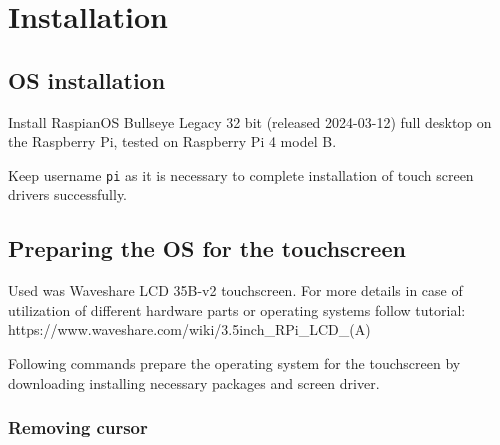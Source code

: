 \section{Installation}\label{installation}

\subsection{OS installation}\label{os-installation}

Install RaspianOS Bullseye Legacy 32 bit (released 2024-03-12) full
desktop on the Raspberry Pi, tested on Raspberry Pi 4 model B.

Keep username \texttt{pi} as it is necessary to complete installation of
touch screen drivers successfully.

\subsection{Preparing the OS for the
touchscreen}\label{preparing-the-os-for-the-touchscreen}

Used was Waveshare LCD 35B-v2 touchscreen. For more details in case of
utilization of different hardware parts or operating systems follow
tutorial: https://www.waveshare.com/wiki/3.5inch\_RPi\_LCD\_(A)

Following commands prepare the operating system for the touchscreen by
downloading installing necessary packages and screen driver.

\begin{Shaded}
\begin{Highlighting}[]
 
\NormalTok{ \textasciitilde{}}
\end{Highlighting}
\end{Shaded}

\subsubsection{Removing cursor}\label{removing-cursor}

